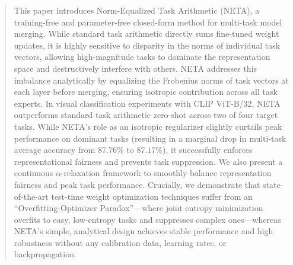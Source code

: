 \begin{abstract}
  This paper introduces Norm-Equalized Task Arithmetic (NETA), a training-free and parameter-free closed-form method for multi-task model merging. While standard task arithmetic directly sums fine-tuned weight updates, it is highly sensitive to disparity in the norms of individual task vectors, allowing high-magnitude tasks to dominate the representation space and destructively interfere with others. NETA addresses this imbalance analytically by equalizing the Frobenius norms of task vectors at each layer before merging, ensuring isotropic contribution across all task experts. In visual classification experiments with CLIP ViT-B/32, NETA outperforms standard task arithmetic zero-shot across two of four target tasks. While NETA's role as an isotropic regularizer slightly curtails peak performance on dominant tasks (resulting in a marginal drop in multi-task average accuracy from $87.76\%$ to $87.17\%$), it successfully enforces representational fairness and prevents task suppression. We also present a continuous $\alpha$-relaxation framework to smoothly balance representation fairness and peak task performance. Crucially, we demonstrate that state-of-the-art test-time weight optimization techniques suffer from an ``Overfitting-Optimizer Paradox''---where joint entropy minimization overfits to easy, low-entropy tasks and suppresses complex ones---whereas NETA's simple, analytical design achieves stable performance and high robustness without any calibration data, learning rates, or backpropagation.
\end{abstract}
